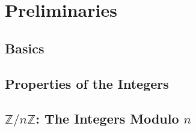 \chapter*{Preliminaries}

\section{Basics}

\section{Properties of the Integers}

\section{$\mathbb{Z}/n\mathbb{Z}$: The Integers Modulo $n$}